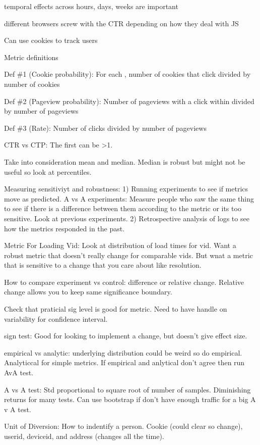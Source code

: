 \documentclass[]{book}
\begin{document}
temporal effects across hours, days, weeks are important

different browsers screw with the CTR depending on how they deal with JS

Can use cookies to track users

Metric definitions

Def \#1 (Cookie probability): For each , number of cookies that click divided by number of cookies

Def \#2 (Pageview probability): Number of pageviews with a click within divided by number of pageviews

Def \#3 (Rate): Number of clicks divided by number of pageviews

CTR vs CTP: The first can be \textgreater{}1.

Take into consideration mean and median. Median is robust but might not be useful so look at percentiles.

Measuring sensitiviyt and robustness: 1) Running experiments to see if metrics move as predicted. A vs A experiments: Measure people who saw the same thing to see if there is a difference between them according to the metric or its too sensitive. Look at previous experiments. 2) Retrospective analysis of logs to see how the metrics responded in the past.

Metric For Loading Vid: Look at distribution of load times for vid. Want a robust metric that doesn't really change for comparable vids. But wnat a metric that is sensitive to a change that you care about like resolution.

How to compare experiment vs control: difference or relative change. Relative change allows you to keep same significance boundary.

Check that praticial sig level is good for metric. Need to have handle on variability for confidence interval.

sign test: Good for looking to implement a change, but doesn't give effect size.

empirical vs analytic: underlying distribution could be weird so do empirical. Analyticcal for simple metrics. If empirical and anlytical don't agree then run AvA test.

A vs A test: Std proportional to square root of number of samples. Diminishing returns for many tests. Can use bootstrap if don't have enough traffic for a big A v A test.

Unit of Diversion: How to indentify a person. Cookie (could clear so change), userid, deviceid, and address (changes all the time).
\end{document}
